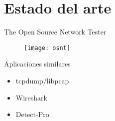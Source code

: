 \section{Estado del arte}

\begin{frame}{The Open Source Network Tester}
  \begin{figure}
    \texttt{[image: osnt]}
  \end{figure}
\end{frame}

\begin{frame}{Aplicaciones similares}
  \begin{itemize}[<alert@+>]
    \item tcpdump/libpcap
    \item Wireshark
    \item Detect-Pro
  \end{itemize}
\end{frame}
